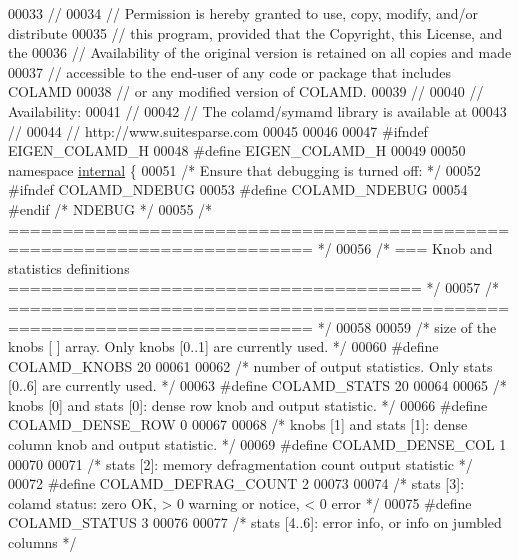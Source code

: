\begin{DoxyCode}
00033 \textcolor{comment}{// }
00034 \textcolor{comment}{//   Permission is hereby granted to use, copy, modify, and/or distribute}
00035 \textcolor{comment}{//   this program, provided that the Copyright, this License, and the}
00036 \textcolor{comment}{//   Availability of the original version is retained on all copies and made}
00037 \textcolor{comment}{//   accessible to the end-user of any code or package that includes COLAMD}
00038 \textcolor{comment}{//   or any modified version of COLAMD. }
00039 \textcolor{comment}{// }
00040 \textcolor{comment}{//     Availability:}
00041 \textcolor{comment}{// }
00042 \textcolor{comment}{//   The colamd/symamd library is available at}
00043 \textcolor{comment}{// }
00044 \textcolor{comment}{//       http://www.suitesparse.com}
00045 
00046   
00047 \textcolor{preprocessor}{#ifndef EIGEN\_COLAMD\_H}
00048 \textcolor{preprocessor}{#define EIGEN\_COLAMD\_H}
00049 
00050 \textcolor{keyword}{namespace }\hyperlink{namespaceinternal}{internal} \{
00051 \textcolor{comment}{/* Ensure that debugging is turned off: */}
00052 \textcolor{preprocessor}{#ifndef COLAMD\_NDEBUG}
00053 \textcolor{preprocessor}{#define COLAMD\_NDEBUG}
00054 \textcolor{preprocessor}{#endif }\textcolor{comment}{/* NDEBUG */}\textcolor{preprocessor}{}
00055 \textcolor{comment}{/* ========================================================================== */}
00056 \textcolor{comment}{/* === Knob and statistics definitions ====================================== */}
00057 \textcolor{comment}{/* ========================================================================== */}
00058 
00059 \textcolor{comment}{/* size of the knobs [ ] array.  Only knobs [0..1] are currently used. */}
00060 \textcolor{preprocessor}{#define COLAMD\_KNOBS 20}
00061 
00062 \textcolor{comment}{/* number of output statistics.  Only stats [0..6] are currently used. */}
00063 \textcolor{preprocessor}{#define COLAMD\_STATS 20 }
00064 
00065 \textcolor{comment}{/* knobs [0] and stats [0]: dense row knob and output statistic. */}
00066 \textcolor{preprocessor}{#define COLAMD\_DENSE\_ROW 0}
00067 
00068 \textcolor{comment}{/* knobs [1] and stats [1]: dense column knob and output statistic. */}
00069 \textcolor{preprocessor}{#define COLAMD\_DENSE\_COL 1}
00070 
00071 \textcolor{comment}{/* stats [2]: memory defragmentation count output statistic */}
00072 \textcolor{preprocessor}{#define COLAMD\_DEFRAG\_COUNT 2}
00073 
00074 \textcolor{comment}{/* stats [3]: colamd status:  zero OK, > 0 warning or notice, < 0 error */}
00075 \textcolor{preprocessor}{#define COLAMD\_STATUS 3}
00076 
00077 \textcolor{comment}{/* stats [4..6]: error info, or info on jumbled columns */} 

\end{DoxyCode}
